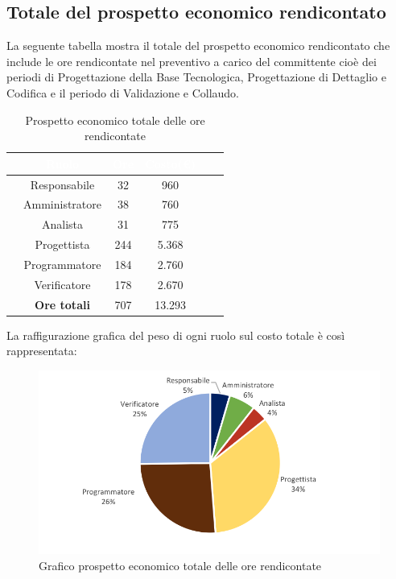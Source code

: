 \subsection{Totale del prospetto economico rendicontato}
La seguente tabella mostra il totale del prospetto economico rendicontato che  include le ore rendicontate nel preventivo a carico del committente cioè dei periodi di Progettazione della Base Tecnologica, Progettazione di Dettaglio e Codifica e il periodo di Validazione e Collaudo.

\begin{table}[ht]
	\begin{center}
		\begin{tabular}{cccccc}
			\rowcolor{coolblack}
			\hline
			&\textcolor{white}{Ruolo}&	\textcolor{white}{Ore} &\textcolor{white}{Costo(\euro)} \\
			\hline
			&Responsabile           &32&960\\
			&Amministratore        & 38& 760 \\
			&Analista                   & 31& 775\\
			&Progettista              &  244& 5.368\\
			&Programmatore       & 184& 2.760 \\
			&Verificatore             & 178& 2.670\\
			\hline
			&\textbf{Ore totali}    &707&13.293\\
		\end{tabular}
		\caption{Prospetto economico totale delle ore rendicontate}
	\end{center}
\end{table}

La raffigurazione grafica del peso di ogni ruolo sul costo totale è così rappresentata:

\begin{figure}[!ht]
	\begin{center}
		\includegraphics[scale=0.90]{images/grafoOreRendicontateEuro.png}
		\caption{Grafico prospetto economico totale delle ore rendicontate}
	\end{center}
\end{figure}

